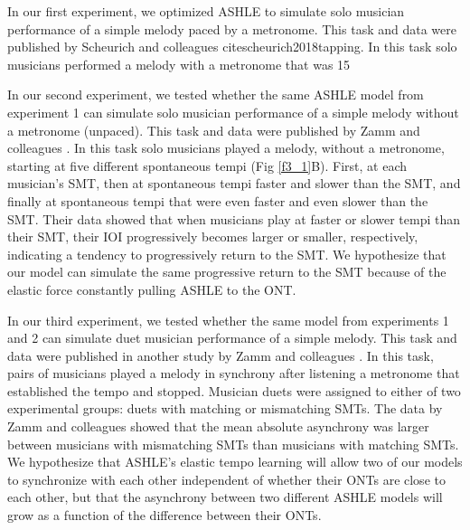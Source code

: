 \documentclass{report}
\begin{document}
In our first experiment, we optimized ASHLE to simulate solo musician performance of a simple melody paced by a metronome. This task and data were published by Scheurich and colleagues cite{scheurich2018tapping}. In this task solo musicians performed a melody with a metronome that was 15%

In our second experiment, we tested whether the same ASHLE model from experiment 1 can simulate solo musician performance of a simple melody without a metronome (unpaced). This task and data were published by Zamm and colleagues \cite{zamm2018musicians}. In this task solo musicians played a melody, without a metronome, starting at five different spontaneous tempi (Fig \ref{f3_1}B). First, at each musician's SMT, then at spontaneous tempi faster and slower than the SMT, and finally at spontaneous tempi that were even faster and even slower than the SMT. Their data showed that when musicians play at faster or slower tempi than their SMT, their IOI progressively becomes larger or smaller, respectively, indicating a tendency to progressively return to the SMT. We hypothesize that our model can simulate the same progressive return to the SMT because of the elastic force constantly pulling ASHLE to the ONT. 

In our third experiment, we tested whether the same model from experiments 1 and 2 can simulate duet musician performance of a simple melody. This task and data were published in another study by Zamm and colleagues \cite{zamm2016endogenous}. In this task, pairs of musicians played a melody in synchrony after listening a metronome that established the tempo and stopped. Musician duets were assigned to either of two experimental groups: duets with matching or mismatching SMTs. The data by Zamm and colleagues \cite{zamm2016endogenous} showed that the mean absolute asynchrony was larger between musicians with mismatching SMTs than musicians with matching SMTs. We hypothesize that ASHLE's elastic tempo learning will allow two of our models to synchronize with each other independent of whether their ONTs are close to each other, but that the asynchrony between two different ASHLE models will grow as a function of the difference between their ONTs.
\end{document}
